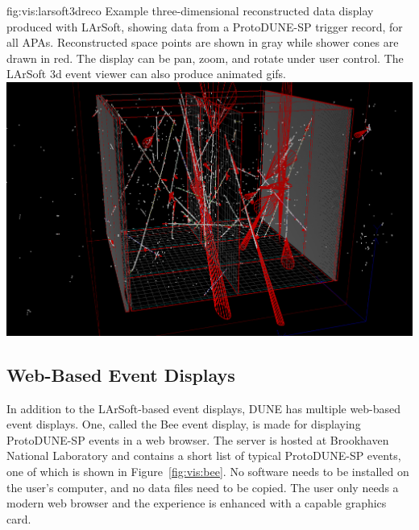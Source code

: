 \documentclass[../main-v1.tex]{subfiles}
\begin{document}
\begin{dunefigure}
{fig:vis:larsoft3dreco} 
{Example three-dimensional reconstructed data display produced with LArSoft, showing data from a ProtoDUNE-SP trigger record, for all APAs.  Reconstructed space points are shown in gray while shower cones are drawn in red.  The display can be pan, zoom, and rotate under user control.  The LArSoft 3d event viewer can also produce animated gifs.}
\includegraphics[width=0.8 \textwidth]{graphics/EventDisplays/larsoft_reco_evd_3d.png}
\end{dunefigure}

\subsection{Web-Based Event Displays}
\label{sec:visualization:web}

In addition to the LArSoft-based event displays, DUNE has multiple web-based event displays.  One, called the Bee event display, is made for displaying ProtoDUNE-SP events in a web browser.  The server is hosted at Brookhaven National Laboratory and contains a short list of typical ProtoDUNE-SP events, one of which is shown in Figure~\ref{fig:vis:bee}. No software needs to be installed on the user's computer, and no data files need to be copied.  The user only needs a modern web browser and the experience is enhanced with a capable graphics card.
\end{document}

